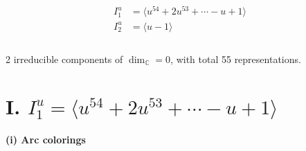 \documentclass[1p]{elsarticle_modified}
\theoremstyle{definition}
\begin{document}
\begin{align*}
I^u_{1}&=\langle 
u^{54}+2 u^{53}+\cdots- u+1\rangle \\
I^u_{2}&=\langle 
u-1\rangle \\
\\
\end{align*}
\raggedright * 2 irreducible components of $\dim_{\mathbb{C}}=0$, with total 55 representations.\\
\newpage
\renewcommand{\arraystretch}{1}
\centering \section*{I. $I^u_{1}= \langle u^{54}+2 u^{53}+\cdots- u+1 \rangle$}
\flushleft \textbf{(i) Arc colorings}\\
\end{document}
